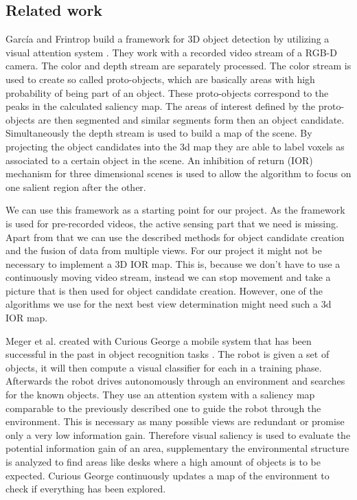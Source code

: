 \documentclass[a4paper,11pt,english]{article}
\begin{document}
\subsection{Related work}
García and Frintrop build a framework for 3D object detection by utilizing a visual attention system \cite{garcia2013computational}.
They work with a recorded video stream of a RGB-D camera. The color and depth stream are separately processed. 
The color stream is used to create so called proto-objects, which are basically areas with high probability of being part of an object. These proto-objects correspond to the peaks in the calculated saliency map. 
The areas of interest defined by the proto-objects are then segmented and similar segments form then an object candidate. Simultaneously the depth stream is used to build a map of the scene.
By projecting the object candidates into the 3d map they are able to label voxels as associated to a certain object in the scene.
An inhibition of return (IOR) mechanism for three dimensional scenes is used to allow the algorithm to focus on one salient region after the other.

We can use this framework as a starting point for our project.
As the framework is used for pre-recorded videos, the active sensing part that we need is missing.
Apart from that we can use the described methods for object candidate creation and the fusion of data from multiple views.
For our project it might not be necessary to implement a 3D IOR map. This is, because we don't have to use a continuously moving video stream, instead we can stop movement and take a picture that is then used for object candidate creation. 
However, one of the algorithms we use for the next best view determination might need such a 3d IOR map.\medskip

Meger et al. created with Curious George a mobile system that has been successful in the past in object recognition tasks \cite{meger2010curious}.
The robot is given a set of objects, it will then compute a visual classifier for each in a training phase.
Afterwards the robot drives autonomously through an environment and searches for the known objects.
They use an attention system with a saliency map comparable to the previously described one to guide the robot through the environment. This is necessary as many possible views are redundant or promise only a very low information gain.
Therefore visual saliency is used to evaluate the potential information gain of an area, supplementary the environmental structure is analyzed to find areas like desks where a high amount of objects is to be expected.
Curious George continuously updates a map of the environment to check if everything has been explored.
\end{document}
